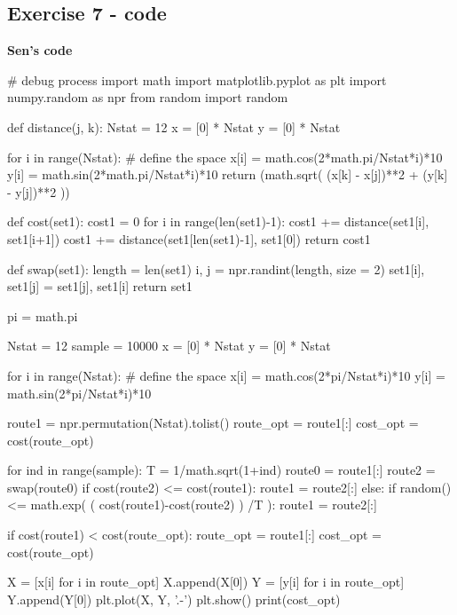 \subsection*{Exercise 7 - code}
\textbf{Sen's code}
\begin{python}
# debug process
import math
import matplotlib.pyplot as plt
import numpy.random as npr
from random import random

def distance(j, k):
    Nstat = 12
    x = [0] * Nstat
    y = [0] * Nstat
    
    for i in range(Nstat):  # define the space
        x[i] = math.cos(2*math.pi/Nstat*i)*10
        y[i] = math.sin(2*math.pi/Nstat*i)*10
    return (math.sqrt( (x[k] - x[j])**2 + (y[k] - y[j])**2 ))

def cost(set1):
    cost1 = 0
    for i in range(len(set1)-1):
        cost1 += distance(set1[i], set1[i+1])
    cost1 += distance(set1[len(set1)-1], set1[0])
    return cost1
 
def swap(set1):
    length = len(set1)
    i, j = npr.randint(length, size = 2)
    set1[i], set1[j] = set1[j], set1[i]
    return set1

pi = math.pi

Nstat = 12
sample = 10000
x = [0] * Nstat
y = [0] * Nstat

for i in range(Nstat):  # define the space
    x[i] = math.cos(2*pi/Nstat*i)*10
    y[i] = math.sin(2*pi/Nstat*i)*10

route1 = npr.permutation(Nstat).tolist()
route_opt = route1[:]
cost_opt = cost(route_opt)

for ind in range(sample):
    T = 1/math.sqrt(1+ind)
    route0 = route1[:]
    route2 = swap(route0)
    if cost(route2) <= cost(route1):
        route1 = route2[:]
    else:
        if random() <= math.exp( ( cost(route1)-cost(route2) ) /T ):
            route1 = route2[:] 
    
    if cost(route1) < cost(route_opt):
        route_opt = route1[:]
        cost_opt = cost(route_opt)
    
    X = [x[i] for i in route_opt]
    X.append(X[0])
    Y = [y[i] for i in route_opt]
    Y.append(Y[0])
plt.plot(X, Y, '.-')
plt.show()
print(cost_opt)
\end{python}
